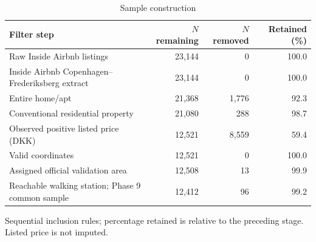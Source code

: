 \begin{table}[p]
\centering
\small
\begin{threeparttable}
\caption{Sample construction}\label{tab:sample-construction}
\begin{tabular}{>{\raggedright\arraybackslash}p{8cm}rrr}
\toprule
Filter step & $N$ remaining & $N$ removed & Retained (\%) \\
\midrule
Raw Inside Airbnb listings & 23,144 & 0 & 100.0 \\
Inside Airbnb Copenhagen--Frederiksberg extract & 23,144 & 0 & 100.0 \\
Entire home/apt & 21,368 & 1,776 & 92.3 \\
Conventional residential property & 21,080 & 288 & 98.7 \\
Observed positive listed price (DKK) & 12,521 & 8,559 & 59.4 \\
Valid coordinates & 12,521 & 0 & 100.0 \\
Assigned official validation area & 12,508 & 13 & 99.9 \\
Reachable walking station; Phase 9 common sample & 12,412 & 96 & 99.2 \\
\bottomrule
\end{tabular}
\begin{tablenotes}[flushleft]\footnotesize
\item Sequential inclusion rules; percentage retained is relative to the preceding stage. Listed price is not imputed.
\end{tablenotes}
\end{threeparttable}
\end{table}
